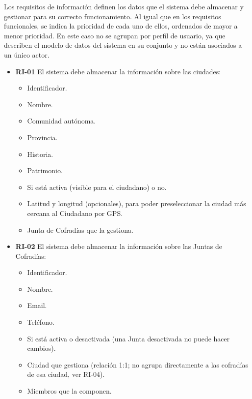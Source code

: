 Los requisitos de información definen los datos que el sistema debe almacenar y gestionar para su correcto funcionamiento. Al igual que en los requisitos funcionales, se indica la prioridad de cada uno de ellos, ordenados de mayor a menor prioridad. En este caso no se agrupan por perfil de usuario, ya que describen el modelo de datos del sistema en su conjunto y no están asociados a un único actor.
 
\begin{itemize}

    \item \textbf{RI-01}  El sistema debe almacenar la información sobre las ciudades:
    \begin{itemize}
        \item Identificador.
        \item Nombre.
        \item Comunidad autónoma.
        \item Provincia.
        \item Historia.
        \item Patrimonio.
        \item Si está activa (visible para el ciudadano) o no.
        \item Latitud y longitud (opcionales), para poder preseleccionar la ciudad más cercana al Ciudadano por GPS.
        \item Junta de Cofradías que la gestiona.
    \end{itemize}

    \item \textbf{RI-02}  El sistema debe almacenar la información sobre las Juntas de
    Cofradías:
    \begin{itemize}
        \item Identificador.
        \item Nombre.
        \item Email.
        \item Teléfono.
        \item Si está activa o desactivada (una Junta desactivada no puede hacer cambios).
        \item Ciudad que gestiona (relación 1:1; no agrupa directamente a las cofradías de esa ciudad, ver RI-04).
        \item Miembros que la componen.
    \end{itemize}


\end{itemize}

